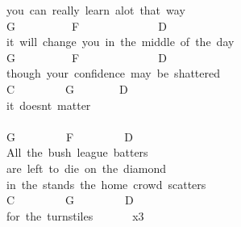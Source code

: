{you\ can\ really\ learn\ alot\ that\ way\\
G\ \ \ \ \ \ \ \ \ \ F\ \ \ \ \ \ \ \ \ \ \ \ \ \ D\\
it\ will\ change\ you\ in\ the\ middle\ of\ the\ day\\
G\ \ \ \ \ \ \ \ \ \ F\ \ \ \ \ \ \ \ \ \ \ \ \ \ D\\
though\ your\ confidence\ may\ be\ shattered\\
C\ \ \ \ \ \ \ \ \ G\ \ \ \ \ \ \ \ D\\
it\ doesnt\ matter\ \\
\\
G\ \ \ \ \ \ \ \ \ F\ \ \ \ \ \ \ \ \ D\\
All\ the\ bush\ league\ batters\\
are\ left\ to\ die\ on\ the\ diamond\ \\
in\ the\ stands\ the\ home\ crowd\ scatters\\
C\ \ \ \ \ \ \ \ \ G\ \ \ \ \ \ \ \ \ D\\
for\ the\ turnstiles\ \ \ \ \ \ \ x3}

